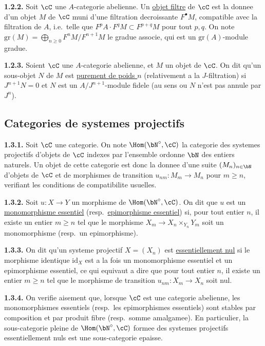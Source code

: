 \medskip
\noindent\textbf{1.2.2.} Soit $\cC$ une $A$-categorie abelienne. Un \underline{objet filtre} de $\cC$ est la donnee d'un objet $M$ de $\cC$ muni d'une filtration decroissante $F^\bullet M$, compatible avec la filtration de $A$, i.e.\ telle que $F^p A \cdot F^q M \subset F^{p+q} M$ pour tout $p,q$. On note $\mathrm{gr}(M) = \bigoplus_{n \geq 0} F^n M/F^{n+1} M$ le gradue associe, qui est un $\mathrm{gr}(A)$-module gradue.

\medskip
\noindent\textbf{1.2.3.} Soient $\cC$ une $A$-categorie abelienne, et $M$ un objet de $\cC$. On dit qu'un sous-objet $N$ de $M$ est \underline{purement de poids $n$} (relativement a la $J$-filtration) si $J^{n+1} N = 0$ et $N$ est un $A/J^{n+1}$-module fidele (au sens ou $N$ n'est pas annule par $J^n$).

\subsection{Categories de systemes projectifs}

\medskip
\noindent\textbf{1.3.1.} Soit $\cC$ une categorie. On note $\Hom(\bN^\circ, \cC)$ la categorie des systemes projectifs d'objets de $\cC$ indexes par l'ensemble ordonne $\bN$ des entiers naturels. Un objet de cette categorie est donc la donnee d'une suite $(M_n)_{n \in \bN}$ d'objets de $\cC$ et de morphismes de transition $u_{nm} : M_m \longrightarrow M_n$ pour $m \geq n$, verifiant les conditions de compatibilite usuelles.

\medskip
\noindent\textbf{1.3.2.} Soit $u : X \longrightarrow Y$ un morphisme de $\Hom(\bN^\circ, \cC)$. On dit que $u$ est un \underline{monomorphisme essentiel} (resp.\ \underline{epimorphisme essentiel}) si, pour tout entier $n$, il existe un entier $m \geq n$ tel que le morphisme $X_m \longrightarrow X_n \times_{Y_n} Y_m$ soit un monomorphisme (resp.\ un epimorphisme).

\medskip
\noindent\textbf{1.3.3.} On dit qu'un systeme projectif $X = (X_n)$ est \underline{essentiellement nul} si le morphisme identique $\mathrm{id}_X$ est a la fois un monomorphisme essentiel et un epimorphisme essentiel, ce qui equivaut a dire que pour tout entier $n$, il existe un entier $m \geq n$ tel que le morphisme de transition $u_{nm} : X_m \longrightarrow X_n$ soit nul.

\medskip
\noindent\textbf{1.3.4.} On verifie aisement que, lorsque $\cC$ est une categorie abelienne, les monomorphismes essentiels (resp.\ les epimorphismes essentiels) sont stables par composition et par produit fibre (resp.\ somme amalgamee). En particulier, la sous-categorie pleine de $\Hom(\bN^\circ, \cC)$ formee des systemes projectifs essentiellement nuls est une sous-categorie epaisse.

